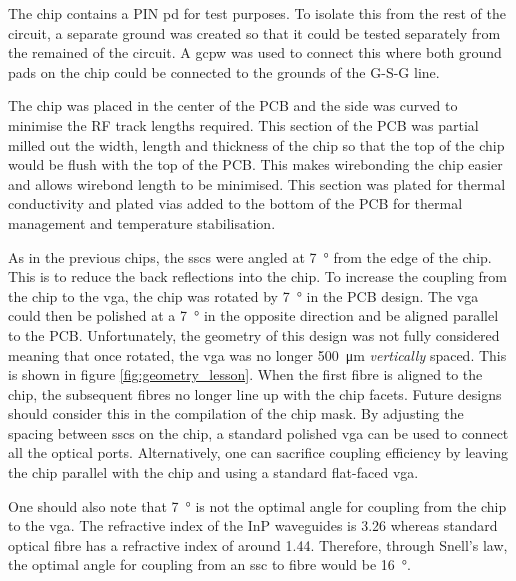 The chip contains a PIN \ac{pd} for test purposes. To isolate this from the rest of the circuit, a separate ground was created so that it could be tested separately from the remained of the circuit. A \ac{gcpw} was used to connect this where both ground pads on the chip could be connected to the grounds of the G-S-G line.


The chip was placed in the center of the PCB and the side was curved to minimise the RF track lengths required. This section of the PCB was partial milled out the width, length and thickness of the chip so that the top of the chip would be flush with the top of the PCB. This makes wirebonding the chip easier and allows wirebond length to be minimised. This section was plated for thermal conductivity and plated vias added to the bottom of the PCB for thermal management and temperature stabilisation. 

As in the previous chips, the \acp{ssc} were angled at \SI{7}{\degree} from the edge of the chip. This is to reduce the back reflections into the chip. To increase the coupling from the chip to the \ac{vga}, the chip was rotated by \SI{7}{\degree} in the PCB design. The \ac{vga} could then be polished at a \SI{7}{\degree} in the opposite direction and be aligned parallel to the PCB. Unfortunately, the geometry of this design was not fully considered meaning that once rotated, the \ac{vga} was no longer \SI{500}{\um} \textit{vertically} spaced. This is shown in figure \ref{fig:geometry_lesson}. When the first fibre is aligned to the chip, the subsequent fibres no longer line up with the chip facets. Future designs should consider this in the compilation of the chip mask. By adjusting the spacing between \acp{ssc} on the chip, a standard polished \ac{vga} can be used to connect all the optical ports. Alternatively, one can sacrifice coupling efficiency by leaving the chip parallel with the chip and using a standard flat-faced \ac{vga}.


One should also note that \SI{7}{\degree} is not the optimal angle for coupling from the chip to the \ac{vga}. The refractive index of the \ac{InP} waveguides is 3.26 whereas standard optical fibre has a refractive index of around 1.44. Therefore, through Snell's law, the optimal angle for coupling from an \ac{ssc} to fibre would be \SI{16}{\degree}. 

